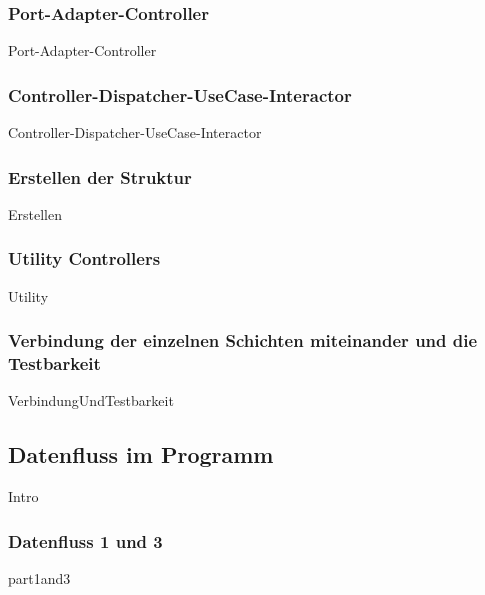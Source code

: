 \documentclass{article}
\begin{document}
            \newpage
            \subsubsection{Port-Adapter-Controller}
            \label{Port-Adapter-Controller}
                {Port-Adapter-Controller}

            \newpage
            \subsubsection{Controller-Dispatcher-UseCase-Interactor} 
            \label{Controller-Dispatcher-UseCase-Interactor}
                {Controller-Dispatcher-UseCase-Interactor}
    
            \newpage
            \subsubsection{Erstellen der Struktur}
                {Erstellen}
   
            \subsubsection{Utility Controllers}
            \label{kap:utilityControllers}
                {Utility}

            \newpage
            \subsubsection{Verbindung der einzelnen Schichten miteinander und die Testbarkeit}
                {VerbindungUndTestbarkeit}

           
               
        \newpage
        \subsection{Datenfluss im Programm}
        \label{kap:Dataflow}
            {Intro}
           
            \newpage
            \subsubsection{Datenfluss \textbf{1} und \textbf{3}}
            {part1and3}
            \newpage
\end{document}

